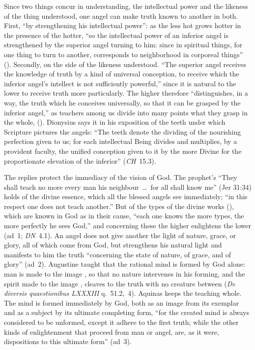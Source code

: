 Since two things concur in understanding, the intellectual power and the
likeness of the thing understood, one angel can make truth known to another
in both. First, ``by strengthening his intellectual power'': as the less hot
grows hotter in the presence of the hotter, ``so the intellectual power of
an inferior angel is strengthened by the superior angel turning to him:
since in spiritual things, for one thing to turn to another, corresponds to
neighborhood in corporeal things'' ().
Secondly, on the side of the likeness understood. ``The superior angel
receives the knowledge of truth by a kind of universal conception, to
receive which the inferior angel's intellect is not sufficiently powerful,''
since it is natural to the lower to receive truth more particularly. The
higher therefore ``distinguishes, in a way, the truth which he conceives
universally, so that it can be grasped by the inferior angel,'' as teachers
among us divide into many points what they grasp in the whole,
(). Dionysius says it in his exposition of the
teeth under which Scripture pictures the angels: ``The teeth denote the
dividing of the nourishing perfection given to us; for each intellectual
Being divides and multiplies, by a provident faculty, the unified conception
given to it by the more Divine for the proportionate elevation of the
inferior'' (\emph{CH}~15.3).

The replies protect the immediacy of the vision of God. The prophet's
``They shall teach no more every man his neighbour~\dots\ for all shall know
me'' (Jer 31:34) holds of the divine essence, which all the blessed angels
see immediately; ``in this respect one does not teach another.'' But of the
types of the divine works (), which are
known in God as in their cause, ``each one knows the more types, the more
perfectly he sees God,'' and concerning these the higher enlightens the
lower (ad~1; \emph{DN}~4.1). An angel does not give another the light of
nature, grace, or glory, all of which come from God, but strengthens his
natural light and manifests to him the truth ``concerning the state of
nature, of grace, and of glory'' (ad~2). Augustine taught that the rational
mind is formed by God alone: man is made to the image , so that no nature intervenes in his forming,
and the spirit made to the image , cleaves to the truth with no creature between
(\emph{De diversis quaestionibus LXXXIII} q.~51.2,~4). Aquinas keeps the
teaching whole. The mind is formed immediately by God, both as an image
from its exemplar and as a subject by its ultimate completing form, ``for
the created mind is always considered to be unformed, except it adhere to
the first truth; while the other kinds of enlightenment that proceed from
man or angel, are, as it were, dispositions to this ultimate form'' (ad~3).

